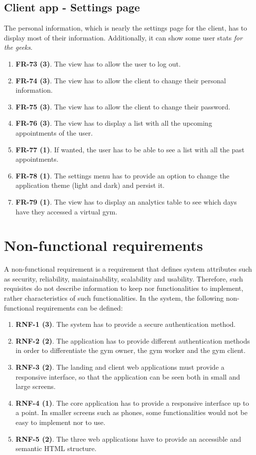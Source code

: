 \documentclass[a4paper, 12pt, oneside]{book}
\begin{document}
\subsection{Client app - Settings page}
The personal information, which is nearly the settings page for the client, has to display most of their information. Additionally, it can show some user stats \emph{for the geeks}.
\begin{enumerate}[label = -]
	\item \textbf{FR-73 (3)}. The view has to allow the user to log out.
	\item \textbf{FR-74 (3)}. The view has to allow the client to change their personal information.
	\item \textbf{FR-75 (3)}. The view has to allow the client to change their password.
	\item \textbf{FR-76 (3)}. The view has to display a list with all the upcoming appointments of the user.
	\item \textbf{FR-77 (1)}. If wanted, the user has to be able to see a list with all the past appointments.
	\item \textbf{FR-78 (1)}. The settings menu has to provide an option to change the application theme (light and dark) and persist it.
	\item \textbf{FR-79 (1)}. The view has to display an analytics table to see which days have they accessed a virtual gym.
\end{enumerate}
\section{Non-functional requirements}
A non-functional requirement is a requirement that defines system attributes such as security, reliability, maintainability, scalability and usability. Therefore, such requisites do not describe information to keep nor functionalities to implement, rather characteristics of such functionalities. In the system, the following non-functional requirements can be defined:
\begin{enumerate}[label = -]
	\item \textbf{RNF-1 (3)}. The system has to provide a secure authentication method.
	\item \textbf{RNF-2 (2)}. The application has to provide different authentication methods in order to differentiate the gym owner, the gym worker and the gym client.
	\item \textbf{RNF-3 (2)}. The landing and client web applications must provide a responsive interface, so that the application can be seen both in small and large screens.
	\item \textbf{RNF-4 (1)}. The core application has to provide a responsive interface up to a point. In smaller screens such as phones, some functionalities would not be easy to implement nor to use.
	\item \textbf{RNF-5 (2)}. The three web applications have to provide an accessible and semantic HTML structure.
\end{enumerate}
\end{document}
